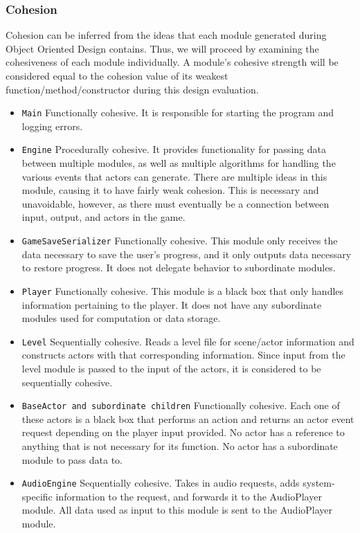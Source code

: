\documentclass{article}
\begin{document}
		\subsubsection{Cohesion}
			Cohesion can be inferred from the ideas that each module generated during Object Oriented Design contains. Thus, we will proceed by examining the cohesiveness of each module individually. A module's cohesive strength will be considered equal to the cohesion value of its weakest function/method/constructor during this design evaluation.
			\begin{itemize}
				\item \texttt{Main} Functionally cohesive. It is responsible for starting the program and logging errors.
        \item \texttt{Engine} Procedurally cohesive. It provides functionality for passing data between multiple modules, as well as multiple algorithms for handling the various events that actors can generate. There are multiple ideas in this module, causing it to have fairly weak cohesion. This is necessary and unavoidable, however, as there must eventually be a connection between input, output, and actors in the game.
        \item \texttt{GameSaveSerializer} Functionally cohesive. This module only receives the data necessary to save the user's progress, and it only outputs data necessary to restore progress. It does not delegate behavior to subordinate modules.
        \item \texttt{Player} Functionally cohesive. This module is a black box that only handles information pertaining to the player. It does not have any subordinate modules used for computation or data storage.
        \item \texttt{Level} Sequentially cohesive. Reads a level file for scene/actor information and constructs actors with that corresponding information. Since input from the level module is passed to the input of the actors, it is considered to be sequentially cohesive.
        \item \texttt{BaseActor and subordinate children} Functionally cohesive. Each one of these actors is a black box that performs an action and returns an actor event request depending on the player input provided. No actor has a reference to anything that is not necessary for its function. No actor has a subordinate module to pass data to.
        \item \texttt{AudioEngine} Sequentially cohesive. Takes in audio requests, adds system-specific information to the request, and forwards it to the AudioPlayer module. All data used as input to this module is sent to the AudioPlayer module.

\end{itemize}
\end{document}

